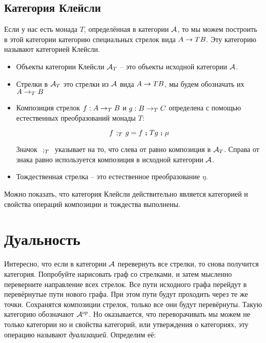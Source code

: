 \begin{centering}



\end{centering}

\subsection{Категория Клейсли}

Если у нас есть монада $T$, определённая в категории $\mathcal{A}$, то мы
можем построить в этой категории категорию специальных стрелок вида
$A \rightarrow TB$. Эту категорию называют категорией Клейсли.

\begin{itemize}
\item
  Объекты категории Клейсли $\mathcal{A}_T$ -- это объекты исходной категории
  $\mathcal{A}$.
\item
  Стрелки в $\mathcal{A}_T$ это стрелки из $\mathcal{A}$ вида $A \rightarrow TB$, мы будем
  обозначать их $A \rightarrow_T B$
\item
  Композиция стрелок $f : A \rightarrow_T B$ и $g : B \rightarrow_T C$ определена с
  помощью естественных преобразований монады $T$:

  \[f \textbf{~$;_{T}$~} g = f \footnotesize\textbf{~;~}\normalsize Tg \footnotesize\textbf{~;~}\normalsize \mu\]

  Значок $\textbf{~$;_{T}$~}$ указывает на то, что слева от равно композиция в
  $\mathcal{A}_T$. Справа от знака равно используется композиция в исходной
  категории $\mathcal{A}$.
\item
  Тождественная стрелка -- это естественное преобразование $\eta$.
\end{itemize}

Можно показать, что категория Клейсли действительно является категорией
и свойства операций композиции и тождества выполнены.

\section{Дуальность}

Интересно, что если в категории $\mathcal{A}$ перевернуть все стрелки, то
снова получится категория. Попробуйте нарисовать граф со стрелками, и
затем мысленно переверните направление всех стрелок. Все пути исходного
графа перейдут в перевёрнутые пути нового графа. При этом пути будут
проходить через те же точки. Сохранятся композиции стрелок, только все
они будут перевёрнуты. Такую категорию обозначают $\mathcal{A}^{op}$. Но
оказывается, что переворачивать мы можем не только категории но и
свойства категорий, или утверждения о категориях, эту операцию называют
\emph{дуализацией}. Определим её:

